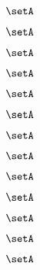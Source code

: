 \begin{forslides}
    \begin{equation}
        \label{eq:combination-166}
        \setA
    \end{equation}
    
     \begin{equation}
        \label{eq:combination-167}
        \setA
    \end{equation}
    
     \begin{equation}
        \label{eq:combination-168}
        \setA
    \end{equation}
    
    \begin{equation}
        \label{eq:combination-169}
       \setA
    \end{equation}
    
       \begin{equation}
        \label{eq:combination-170}
        \setA
    \end{equation}
       
     \begin{equation}
        \label{eq:combination-171}
        \setA
    \end{equation}
    
     \begin{equation}
        \label{eq:combination-172}
        \setA
    \end{equation}
    
    \begin{equation}
        \label{eq:combination-173}
        \setA
    \end{equation}
    
     \begin{equation}
        \label{eq:combination-174}
        \setA
    \end{equation}
    
     \begin{equation}
        \label{eq:combination-175}
        \setA
    \end{equation}
    
    \begin{equation}
        \label{eq:combination-176}
        \setA
    \end{equation}
    
     \begin{equation}
        \label{eq:combination-177}
        \setA
    \end{equation}
    
     \begin{equation}
        \label{eq:combination-178}
        \setA
    \end{equation}
    

\end{forslides}

